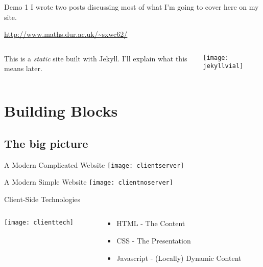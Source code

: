 \documentclass{beamer}
\begin{document}
\begin{frame}{Demo 1}
	I wrote two posts discussing most of what I'm going to cover here on my site.
	
	\medskip
	\begin{center}
		\url{http://www.maths.dur.ac.uk/~sxwc62/}
	\end{center}
	
	\medskip
	\pause
    \begin{columns}
	\begin{column}{0.4\textwidth}
		This is a \emph{static} site built with Jekyll. I'll explain what this means later.
	\end{column}
	\begin{column}{0.5\textwidth}
		\centering
		\texttt{[image: jekyllvial]}
	\end{column}
    \end{columns}
	
\end{frame}


\section{Building Blocks}
\label{sec:bblocks}

\subsection{The big picture} %
\label{sub:the_big_picture}
\begin{frame}{A Modern Complicated Website}
	\centering
	\texttt{[image: clientserver]}
\end{frame}

\begin{frame}{A Modern Simple Website}
	\centering
	\texttt{[image: clientnoserver]}
\end{frame}

\begin{frame}{Client-Side Technologies}
    \begin{columns}
	\begin{column}{0.6\textwidth}
		\centering
		\texttt{[image: clienttech]}
	\end{column}
	\begin{column}{0.4\textwidth}
		\begin{itemize}
			\item<2->HTML - The Content
			\item<3->CSS - The Presentation
			\item<4->Javascript - (Locally) Dynamic Content
		\end{itemize}
	\end{column}
    \end{columns}
\end{frame}
\end{document}
